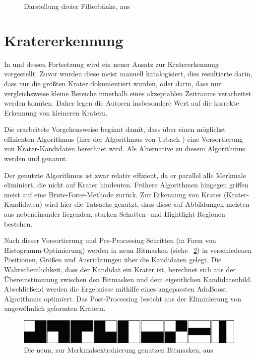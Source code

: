 \begin{figure}[h!]
\begin{subfigure}[t]{0.21\textwidth}
	\end{subfigure}
	\caption{Darstellung dreier Filterbänke, aus \cite{visgeo}}
	\label{fig:filterbank}
\end{figure}

\section{Kratererkennung}
\label{sec:craterdetection}

In \cite{bandeira_10} und dessen Fortsetzung \cite{bandeira_12} wird ein neuer Ansatz zur Kratererkennung vorgestellt. Zuvor wurden diese meist manuell katalogisiert, dies resultierte darin, dass nur die größten Krater dokumentiert wurden, oder darin, dass nur vergleichsweise kleine Bereiche innerhalb eines akzeptablen Zeitraums verarbeitet werden konnten. Daher legen die Autoren insbesondere Wert auf die korrekte Erkennung von kleineren Kratern.

Die erarbeitete Vorgehensweise beginnt damit, dass über einen möglichst effizienten Algorithmus (hier der Algorithmus von Urbach \etal \cite{urbach_stepinski_2009}) eine Vorsortierung von Krater-Kandidaten berechnet wird. Als Alternative zu diesem Algorithmus werden \cite{bandeira_07} und \cite{salamuniccar_10} genannt.

Der genutzte Algorithmus ist zwar relativ effizient, da er parallel alle Merkmale eliminiert, die nicht auf Krater hindeuten. Frühere Algorithmen hingegen griffen meist auf eine Brute-Force-Methode zurück. Zur Erkennung von Krater (\bzw Krater-Kandidaten) wird hier die Tatsache genutzt, dass diese auf Abbildungen meisten aus nebeneinander liegenden, starken Schatten- und Hightlight-Regionen bestehen.

Nach dieser Vorsortierung und Pre-Processing Schritten (in Form von Histogramm-Optimierung) werden in \cite{bandeira_10, bandeira_12} neun Bitmasken (siehe \figurename~\ref{fig:BDS12_01}) in verschiedenen Positionen, Größen und Ausrichtungen über die Kandidaten gelegt. Die Wahrscheinlichkeit, dass der Kandidat ein Krater ist, berechnet sich aus der Übereinstimmung zwischen den Bitmasken und dem eigentlichen Kandidatenbild. Abschließend werden die Ergebnisse mithilfe eines angepassten AdaBoost Algorithmus optimiert. Das Post-Processing besteht aus der Eliminierung von ungewöhnlich geformten Kratern.

\begin{figure}[h!]
	\centering
	\includegraphics[width=.8\textwidth,keepaspectratio]{images/BDS12_01.png}
	\caption{Die neun, zur Merkmalsextrahierung genutzen Bitmasken, aus \cite{bandeira_12}}
	\label{fig:BDS12_01}
\end{figure}

